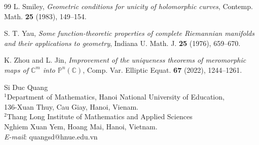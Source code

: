 \documentclass[12pt, a4paper, oneside]{amsart}
\newcommand{\C}{{\mathbb{C}}}
\renewcommand{\P}{{\mathbb{P}}}
\numberwithin{equation}{section}
\begin{document}
\begin{thebibliography}{99}
 L. Smiley, \textit{Geometric conditions for unicity of holomorphic curves}, Contemp. Math. \textbf{25} (1983), 149--154.

 S. T. Yau, \textit{Some function-theoretic properties of complete Riemannian manifolds and their applications to geometry}, Indiana U. Math. J. \textbf{25} (1976), 659--670.

 K. Zhou and L. Jin, \textit{Improvement of the uniqueness theorems of meromorphic maps of $\C^m$ into $\P^n(\C)$}, Comp.  Var. Elliptic Equat. \textbf{67} (2022), 1244--1261.
\end{thebibliography}

\vskip0.1cm
{\footnotesize 
\noindent
{\sc Si Duc Quang}\\
$^1$Department of Mathematics, Hanoi National University of Education,\\
136-Xuan Thuy, Cau Giay, Hanoi, Vienam.\\
$^2$Thang Long Institute of Mathematics and Applied Sciences\\
Nghiem Xuan Yem, Hoang Mai, Hanoi, Vietnam.\\
\textit{E-mail}: quangsd@hnue.edu.vn}
\end{document}
